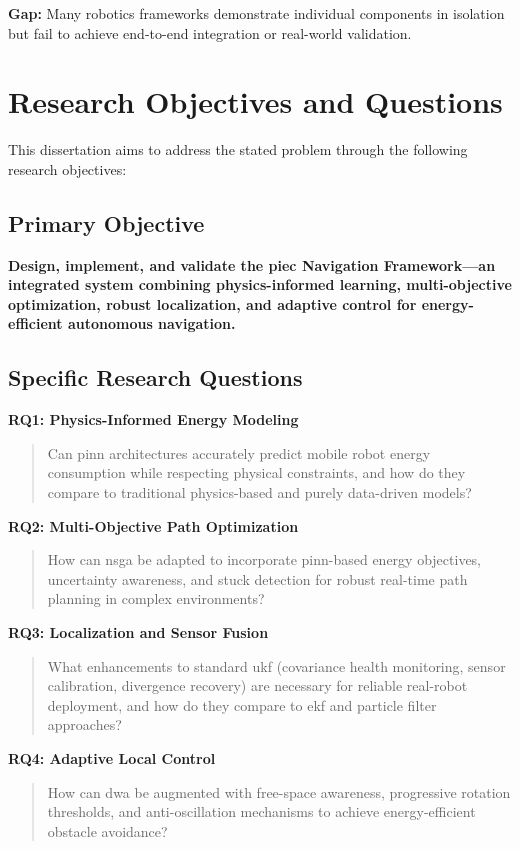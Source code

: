 \textbf{Gap:} Many robotics frameworks demonstrate individual components in isolation but fail to achieve end-to-end integration or real-world validation.

\section{Research Objectives and Questions}
\label{sec:objectives}

This dissertation aims to address the stated problem through the following research objectives:

\subsection{Primary Objective}

\textbf{Design, implement, and validate the \acrshort{piec} Navigation Framework—an integrated system combining physics-informed learning, multi-objective optimization, robust localization, and adaptive control for energy-efficient autonomous navigation.}

\subsection{Specific Research Questions}

\textbf{RQ1: Physics-Informed Energy Modeling}
\begin{quote}
Can \acrshort{pinn} architectures accurately predict mobile robot energy consumption while respecting physical constraints, and how do they compare to traditional physics-based and purely data-driven models?
\end{quote}

\textbf{RQ2: Multi-Objective Path Optimization}
\begin{quote}
How can \acrshort{nsga} be adapted to incorporate \acrshort{pinn}-based energy objectives, uncertainty awareness, and stuck detection for robust real-time path planning in complex environments?
\end{quote}

\textbf{RQ3: Localization and Sensor Fusion}
\begin{quote}
What enhancements to standard \acrshort{ukf} (covariance health monitoring, sensor calibration, divergence recovery) are necessary for reliable real-robot deployment, and how do they compare to \acrshort{ekf} and particle filter approaches?
\end{quote}

\textbf{RQ4: Adaptive Local Control}
\begin{quote}
How can \acrshort{dwa} be augmented with free-space awareness, progressive rotation thresholds, and anti-oscillation mechanisms to achieve energy-efficient obstacle avoidance?
\end{quote}

